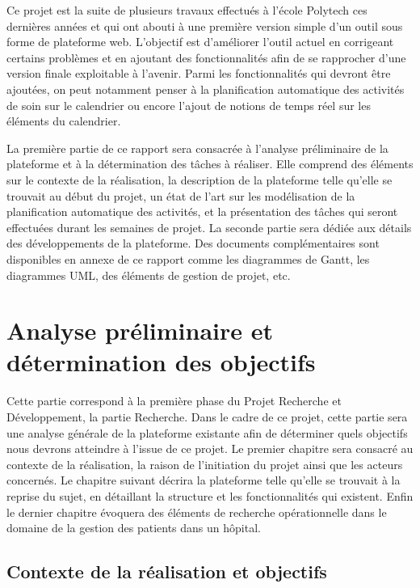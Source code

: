 \documentclass[noposter]{polytech/polytech}
\begin{document}
Ce projet est la suite de plusieurs travaux effectués à l'école Polytech ces dernières années et qui ont abouti à une première version simple d'un outil sous forme de plateforme web. L'objectif est d'améliorer l'outil actuel en corrigeant certains problèmes et en ajoutant des fonctionnalités afin de se rapprocher d'une version finale exploitable à l'avenir. Parmi les fonctionnalités qui devront être ajoutées, on peut notamment penser à la planification automatique des activités de soin sur le calendrier ou encore l'ajout de notions de temps réel sur les éléments du calendrier.

La première partie de ce rapport sera consacrée à l'analyse préliminaire de la plateforme et à la détermination des tâches à réaliser. Elle comprend des éléments sur le contexte de la réalisation, la description de la plateforme telle qu'elle se trouvait au début du projet, un état de l'art sur les modélisation de la planification automatique des activités, et la présentation des tâches qui seront effectuées durant les semaines de projet. La seconde partie sera dédiée aux détails des développements de la plateforme. Des documents complémentaires sont disponibles en annexe de ce rapport comme les diagrammes de Gantt, les diagrammes UML, des éléments de gestion de projet, etc. 



\part{Analyse préliminaire et détermination des objectifs}


Cette partie correspond à la première phase du Projet Recherche et Développement, la partie Recherche. Dans le cadre de ce projet, cette partie sera une analyse générale de la plateforme existante afin de déterminer quels objectifs nous devrons atteindre à l'issue de ce projet. Le premier chapitre sera consacré au contexte de la réalisation, la raison de l'initiation du projet ainsi que les acteurs concernés. Le chapitre suivant décrira la plateforme telle qu'elle se trouvait à la reprise du sujet, en détaillant la structure et les fonctionnalités qui existent. Enfin le dernier chapitre évoquera des éléments de recherche opérationnelle dans le domaine de la gestion des patients dans un hôpital. 


\chapter{Contexte de la réalisation et objectifs}
\label{chap:contexte}
\end{document}

